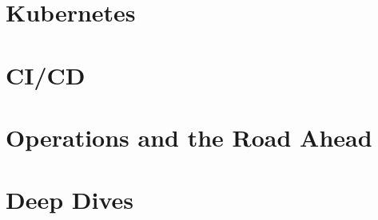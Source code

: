 \documentclass[11pt,twoside,openany]{book}
\begin{document}
\part{Kubernetes}








\part{CI/CD}




\part{Operations and the Road Ahead}





\part{Deep Dives}












\appendix




\end{document}
